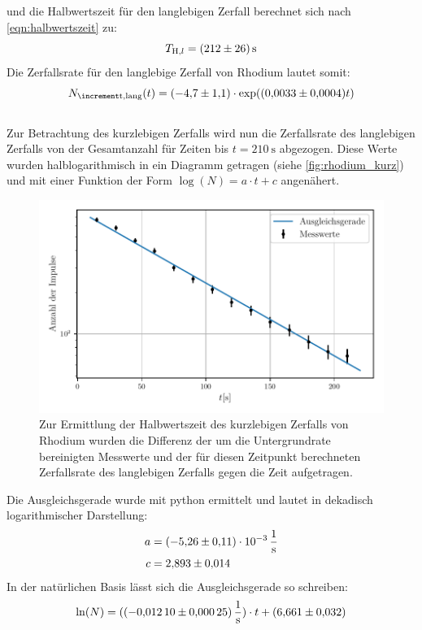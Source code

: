 und die Halbwertszeit für den langlebigen Zerfall berechnet sich nach \eqref{eqn:halbwertszeit} zu:
\begin{equation*}
  T_{\text{H}, l} = \SI{212 \pm 26}{\second}
\end{equation*}
Die Zerfallsrate für den langlebige Zerfall von Rhodium lautet somit:
\begin{equation*}
  N_{\increment \text{t}, \text{lang}}(t) = (\num{-4.7 \pm 1.1})\cdot \exp((\num{0.0033 \pm 0.0004})t)
\end{equation*}
\\
Zur Betrachtung des kurzlebigen Zerfalls wird nun die Zerfallsrate des langlebigen Zerfalls von der Gesamtanzahl für Zeiten bis $t = \SI{210}{\second}$ abgezogen.
Diese Werte wurden halblogarithmisch in ein Diagramm getragen (siehe \autoref{fig:rhodium_kurz}) und mit einer Funktion der Form $\log(N) = a \cdot t + c$ angenähert.
\begin{figure}[H]
  \centering
  \includegraphics[width=\textwidth]{build/rhodium_kurz.pdf}
  \caption{Zur Ermittlung der Halbwertszeit des kurzlebigen Zerfalls von Rhodium wurden die Differenz der um die Untergrundrate bereinigten Messwerte und der für diesen Zeitpunkt berechneten Zerfallsrate des langlebigen Zerfalls gegen die Zeit aufgetragen.}
  \label{fig:rhodium_kurz}
\end{figure}
Die Ausgleichsgerade wurde mit python ermittelt und lautet in dekadisch logarithmischer Darstellung:
\begin{align*}
  a &= \SI{-5.26(11)e-3}{\per\second}\\
  c &= \num{2.893 \pm 0.014}
\end{align*}
In der natürlichen Basis lässt sich die Ausgleichsgerade so schreiben:
\begin{equation} \label{eqn:ln_rho_kurz}
  \ln(N) = (\SI{-0.01210\pm 0.00025}{\per\second})\cdot t + (\num{6.661\pm 0.032})
\end{equation}
